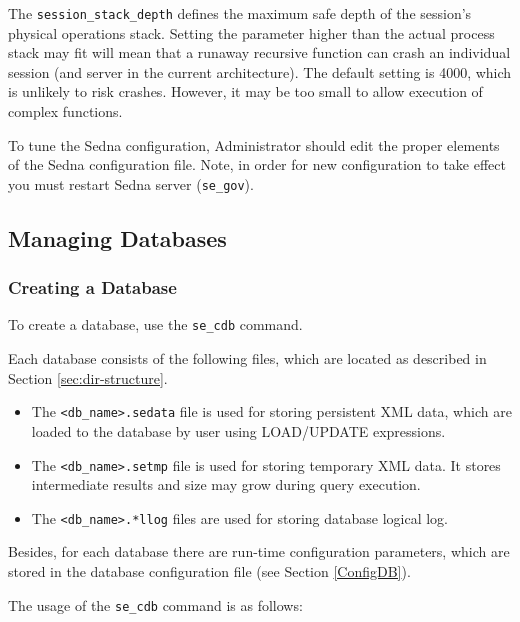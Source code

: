 \documentclass[a4paper,12pt]{article}
\begin{document}
The \verb!session_stack_depth! defines the maximum safe depth of the session's
physical operations stack. Setting the parameter higher than the actual process
stack may fit will mean that a runaway recursive function can crash an
individual session (and server in the current architecture). The default setting
is 4000, which is unlikely to risk crashes. However, it may be too small to
allow execution of complex functions.

To tune the Sedna configuration, Administrator should edit the proper elements
of the Sedna configuration file. Note, in order for new configuration to take
effect you must restart Sedna server (\verb!se_gov!).


\subsection{Managing Databases}
\subsubsection{Creating a Database}
\label{CreateDB}

To create a database, use the \verb!se_cdb! command.

Each database consists of the following files, which are located as described
in Section \ref{sec:dir-structure}.

\begin{itemize}
\item The \verb!<db_name>.sedata! file is used for storing persistent XML data,
which are loaded to the database by user using LOAD/UPDATE expressions.
\item The \verb!<db_name>.setmp! file is used for storing temporary XML data.
It stores intermediate results and size may grow during query execution.
\item The \verb!<db_name>.*llog! files are used for storing database logical
log.
\end{itemize}

Besides, for each database there are run-time configuration parameters, which
are stored in the database configuration file (see Section \ref{ConfigDB}).

The usage of the \verb!se_cdb! command is as follows:
\end{document}
